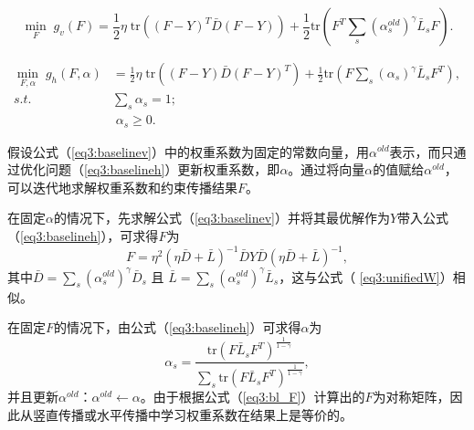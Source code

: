 \begin{equation}
\mathop{\mathrm{min}}_{{F}}\;g_v({F})=\frac{1}{2}\eta\;\mathrm{tr}(({F}-{Y})^T\bar{{D}}({F}-{Y}))+\frac{1}{2}\mathrm{tr}({F}^T \sum_s(\alpha_s^{old})^\gamma\bar{{L}}_s{F}).
\label{eq3:baselinev}
\end{equation}

\begin{equation}
\begin{split}
\mathop{\mathrm{min}}_{{F},{\alpha}}\;g_h({F},{\alpha})&=\frac{1}{2}\eta\;\mathrm{tr}(({F}-{Y})\bar{{D}}({F}-{Y})^T)+\frac{1}{2}\mathrm{tr}({F} \sum_s(\alpha_s)^\gamma\bar{{L}}_s{F}^T), \\
s.t.\quad\;& \sum_s \alpha_s = 1;\\ & \; \alpha_s \ge 0.
\end{split}
\label{eq3:baselineh}
\end{equation}

假设公式（\ref{eq3:baselinev}）中的权重系数为固定的常数向量，用$ {\alpha}^{old} $表示，而只通过优化问题（\ref{eq3:baselineh}）更新权重系数，即$\alpha$。通过将向量$\alpha$的值赋给$ {\alpha}^{old} $，可以迭代地求解权重系数和约束传播结果$F$。

在固定$\alpha$的情况下，先求解公式（\ref{eq3:baselinev}）并将其最优解作为$Y$带入公式（\ref{eq3:baselineh}），可求得$F$为
\begin{equation}
{F} = \eta^2(\eta\bar{{D}}+\bar{{L}})^{-1}\bar{{D}} {Y}\bar{{D}}(\eta\bar{{D}}+\bar{{L}})^{-1}, 
\label{eq3:bl_F}
\end{equation}
其中$\bar{{D}} = \sum_s (\alpha_s^{old})^\gamma  \bar{{D}}_s $ 且 $  \bar{{L}} = \sum_s (\alpha_s^{old})^\gamma  \bar{{L}}_s $，这与公式（ \ref{eq3:unifiedW}）相似。

在固定$F$的情况下，由公式（\ref{eq3:baselineh}）可求得$\alpha$为
\begin{equation}
\alpha_s = \frac{\mathrm{tr}({F} \bar{{L}}_s{F}^T)^\frac{1}{1-\gamma}}{\sum_s \mathrm{tr}({F} \bar{{L}}_s{F}^T)^\frac{1}{1-\gamma}}, 
\end{equation}
并且更新${\alpha}^{old}$：$ {\alpha}^{old} \leftarrow {\alpha}$。由于根据公式（\ref{eq3:bl_F}）计算出的$F$为对称矩阵，因此从竖直传播或水平传播中学习权重系数在结果上是等价的。

